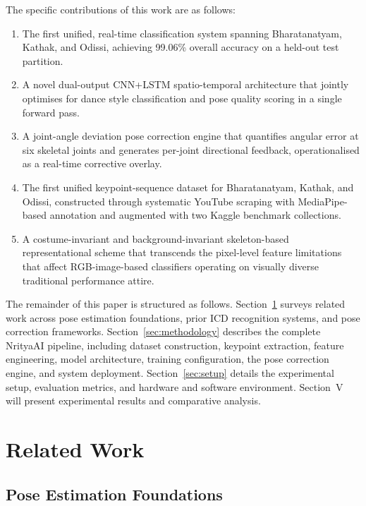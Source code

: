 \documentclass[journal]{IEEEtran}
\begin{document}
The specific contributions of this work are as follows:
\begin{enumerate}
    \item The first unified, real-time classification system spanning
    Bharatanatyam, Kathak, and Odissi, achieving 99.06\% overall
    accuracy on a held-out test partition.
    \item A novel dual-output CNN+LSTM spatio-temporal architecture
    that jointly optimises for dance style classification and
    pose quality scoring in a single forward pass.
    \item A joint-angle deviation pose correction engine that quantifies
    angular error at six skeletal joints and generates per-joint
    directional feedback, operationalised as a real-time corrective
    overlay.
    \item The first unified keypoint-sequence dataset for Bharatanatyam,
    Kathak, and Odissi, constructed through systematic YouTube scraping
    with MediaPipe-based annotation and augmented with two Kaggle
    benchmark collections.
    \item A costume-invariant and background-invariant skeleton-based
    representational scheme that transcends the pixel-level feature
    limitations that affect RGB-image-based classifiers operating on
    visually diverse traditional performance attire.
\end{enumerate}

The remainder of this paper is structured as follows.
Section~\ref{sec:related} surveys related work across pose estimation
foundations, prior ICD recognition systems, and pose correction
frameworks. Section~\ref{sec:methodology} describes the complete
NrityaAI pipeline, including dataset construction, keypoint extraction,
feature engineering, model architecture, training configuration, the
pose correction engine, and system deployment. Section~\ref{sec:setup}
details the experimental setup, evaluation metrics, and hardware and
software environment. Section~V will present experimental results and
comparative analysis.

\section{Related Work}
\label{sec:related}

\subsection{Pose Estimation Foundations}
\end{document}
